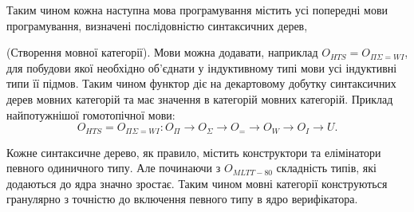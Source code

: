 Таким чином кожна наступна мова програмування містить усі попередні
мови програмування, визначені послідовністю синтаксичних дерев,

\begin{definition} (Створення мовної категорії).
Мови можна додавати, наприклад $O_{HTS} = O_{\Pi\Sigma=WI}$, для побудови якої необхідно
об'єднати у індуктивному типі мови усі індуктивні типи її підмов.
Таким чином функтор діє на декартовому добутку синтаксичних дерев мовних категорій
та має значення в категорій мовних категорій. Приклад найпотужнішої гомотопічної мови:
\begin{equation}
O_{HTS} = O_{\Pi\Sigma=WI} : O_\Pi \rightarrow O_\Sigma \rightarrow O_= \rightarrow O_W \rightarrow O_I \rightarrow U.
\end{equation}
\end{definition}

Кожне синтаксичне дерево, як правило, містить конструктори
та елімінатори певного одиничного типу. Але починаючи з $O_{MLTT-80}$
складність типів, які додаються до ядра значно зростає.
Таким чином мовні категорії конструються гранулярно з
точністю до включення певного типу в ядро верифікатора.

